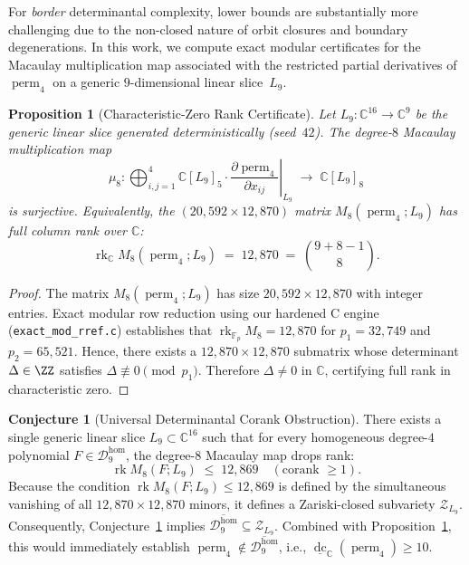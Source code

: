 \documentclass[11pt,a4paper]{amsart}
\newcommand{\perm}{\operatorname{perm}}
\newcommand{\bDC}{\underline{\operatorname{dc}}}
\newcommand{\rk}{\operatorname{rk}}
\newcommand{\CC}{\mathbb{C}}
\newcommand{\FF}{\mathbb{F}}
\newcommand{\calD}{\mathcal{D}}
\newtheorem{proposition}[theorem]{Proposition}
\theoremstyle{definition}
\newtheorem{conjecture}[theorem]{Conjecture}
\begin{document}
For \emph{border} determinantal complexity, lower bounds are substantially more challenging
due to the non-closed nature of orbit closures and boundary degenerations.
In this work, we compute exact modular certificates for the Macaulay multiplication map
associated with the restricted partial derivatives of $\perm_4$ on a generic $9$-dimensional linear slice~$L_9$.

\begin{proposition}[Characteristic-Zero Rank Certificate]\label{prop:perm4-full-rank}
Let $L_9 : \CC^{16} \to \CC^9$ be the generic linear slice generated deterministically
(seed~$42$). The degree-$8$ Macaulay multiplication map
\[
  \mu_8 : \bigoplus_{i,j=1}^4 \CC[L_9]_5 \cdot \left.\frac{\partial \perm_4}{\partial x_{ij}}\right|_{L_9}
  \;\longrightarrow\; \CC[L_9]_8
\]
is surjective. Equivalently, the $(20{,}592 \times 12{,}870)$ matrix $M_8(\perm_4; L_9)$
has full column rank over $\CC$:
\[
  \rk_\CC M_8(\perm_4; L_9) \;=\; 12{,}870 \;=\; \binom{9 + 8 - 1}{8}.
\]
\end{proposition}

\begin{proof}
The matrix $M_8(\perm_4; L_9)$ has size $20{,}592 \times 12{,}870$ with integer entries.
Exact modular row reduction using our hardened C engine (\texttt{exact\_mod\_rref.c})
establishes that $\rk_{\FF_p} M_8 = 12{,}870$ for $p_1 = 32{,}749$ and $p_2 = 65{,}521$.
Hence, there exists a $12{,}870 \times 12{,}870$ submatrix whose determinant $\Delta \in \ZZ$
satisfies $\Delta \not\equiv 0 \pmod{p_1}$. Therefore $\Delta \ne 0$ in $\CC$, certifying
full rank in characteristic zero.
\end{proof}

\begin{conjecture}[Universal Determinantal Corank Obstruction]\label{conj:universal-corank}
There exists a single generic linear slice $L_9 \subset \CC^{16}$ such that for every
homogeneous degree-$4$ polynomial $F \in \calD_9^{\mathrm{hom}}$, the degree-$8$ Macaulay map
drops rank:
\[
  \rk M_8(F; L_9) \;\le\; 12{,}869 \quad (\text{corank } \ge 1).
\]
Because the condition $\rk M_8(F; L_9) \le 12{,}869$ is defined by the simultaneous vanishing
of all $12{,}870 \times 12{,}870$ minors, it defines a Zariski-closed subvariety $\mathcal{Z}_{L_9}$.
Consequently, Conjecture~\ref{conj:universal-corank} implies $\overline{\calD_9^{\mathrm{hom}}} \subseteq \mathcal{Z}_{L_9}$.
Combined with Proposition~\ref{prop:perm4-full-rank}, this would immediately establish
$\perm_4 \notin \overline{\calD_9^{\mathrm{hom}}}$, i.e., $\bDC_\CC(\perm_4) \ge 10$.
\end{conjecture}
\end{document}
